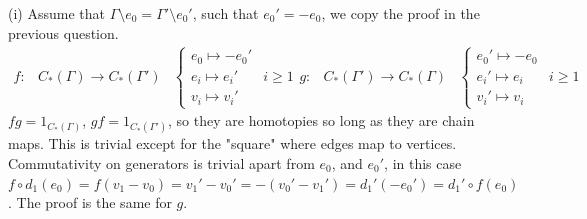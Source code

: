 \documentclass[11pt]{article}
\theoremstyle{definition}
\begin{document}
    (i) Assume that \(\Gamma\setminus e_0 = \Gamma' \setminus e_0'\), such that \(e_0' = -e_0\), we copy the proof in the previous question.
    \begin{align*}
        f: &C_*(\Gamma) \to C_*(\Gamma')
        &\begin{cases}
            e_0 \mapsto -e_0' \\
            e_i \mapsto e_i' & i \geq 1 \\
            v_i \mapsto v_i'
        \end{cases}
        g: &C_*(\Gamma') \to C_*(\Gamma)
        &\begin{cases}
            e_0' \mapsto -e_0 \\
            e_i' \mapsto e_i & i \geq 1 \\
            v_i' \mapsto v_i
        \end{cases}
    \end{align*}
    \(fg = 1_{C_*(\Gamma)}\), \(gf = 1_{C_*(\Gamma')}\), so they are homotopies so long as they are chain maps. This is trivial except for the "square" where edges map to vertices.
    Commutativity on generators is trivial apart from \(e_0\), and \(e_0'\), in this case \(f\circ d_1(e_0) = f(v_1 - v_0) = v_1' - v_0' = -(v_0' - v_1') = d_1'(-e_0') = d_1'\circ f (e_0)\). The proof is the same for \(g\).
\end{document}
